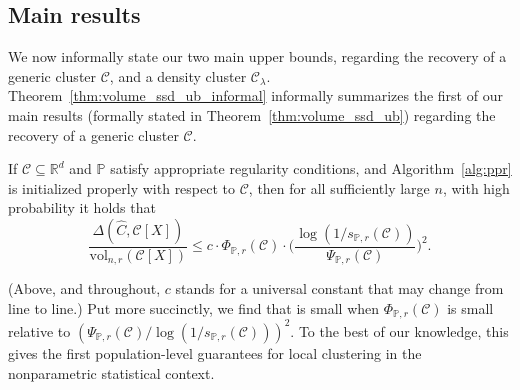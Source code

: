 \documentclass[11pt,twoside]{article}
\newcommand{\Reals}{\mathbb{R}}
\newcommand{\1}{\mathbf{1}}
\newcommand{\Rd}{\Reals^d}
\newcommand{\mc}[1]{\mathcal{#1}}
\newcommand{\Pbb}{\mathbb{P}}
\newcommand{\wh}[1]{\widehat{#1}}
\newcommand{\vol}{\mathrm{vol}}
\begin{document}
\subsection{Main results}
We now informally state our two main upper bounds, regarding the recovery of a generic cluster $\mc{C}$, and a density cluster $\mc{C}_{\lambda}$. Theorem~\ref{thm:volume_ssd_ub_informal} informally summarizes the first of our main results (formally stated in Theorem~\ref{thm:volume_ssd_ub}) regarding the recovery of a generic cluster $\mc{C}$.
\begin{theorem}[Informal]
	\label{thm:volume_ssd_ub_informal}
	If $\mc{C} \subseteq \Rd$ and $\Pbb$ satisfy appropriate regularity conditions, and Algorithm~\ref{alg:ppr} is initialized properly with respect to $\mc{C}$, then for all sufficiently large $n$, with high probability it holds that
	\begin{equation*}
	\frac{\Delta(\wh{C},\mc{C}[X])}{\vol_{n,r}(\mc{C}[X])} \leq c \cdot\Phi_{\Pbb,r}(\mc{C}) \cdot  \biggl(\frac{\log(1/s_{\Pbb,r}(\mc{C}))}{\Psi_{\Pbb,r}(\mc{C})}\biggr)^2.
	\end{equation*}
\end{theorem}

(Above, and throughout, $c$ stands for a universal constant that may change from line to line.) Put more succinctly, we find that \smash{$\Delta(\wh{C},\mc{C}[X])$} is small when $\Phi_{\Pbb,r}(\mc{C})$ is small relative to $(\Psi_{\Pbb,r}(\mc{C})/\log(1/s_{\Pbb,r}(\mc{C})))^2$. To the best of our knowledge, this gives the first population-level guarantees for local clustering in the nonparametric statistical context.
\end{document}

